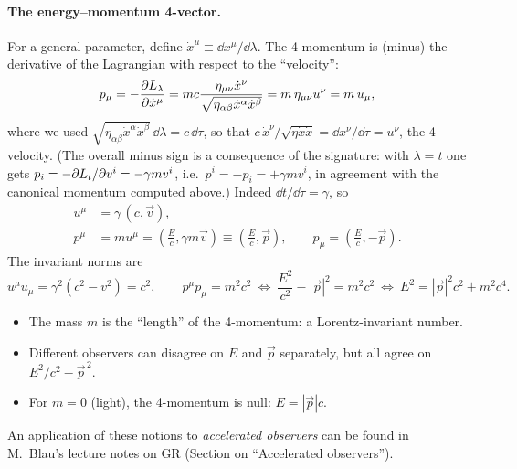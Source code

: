 \paragraph{The energy--momentum 4-vector.} For a general parameter, define $\dot x^\mu\equiv\dd x^\mu/\dd\lambda$. The 4-momentum is (minus) the derivative of the Lagrangian with respect to the ``velocity'':
\begin{equation}
  p_\mu=-\frac{\partial L_\lambda}{\partial\dot x^\mu}=mc\frac{\eta_{\mu\nu}\dot x^\nu}{\sqrt{\eta_{\alpha\beta}\dot x^\alpha\dot x^\beta}}=m\,\eta_{\mu\nu}u^\nu=m\,u_\mu,
\end{equation}
where we used $\sqrt{\eta_{\alpha\beta}\dot x^\alpha\dot x^\beta}\,\dd\lambda=c\,\dd\tau$, so that $c\,\dot x^\nu/\sqrt{\eta\dot x\dot x}=\dd x^\nu/\dd\tau=u^\nu$, the 4-velocity. (The overall minus sign is a consequence of the signature: with $\lambda=t$ one gets $p_i=-\partial L_t/\partial v^i=-\gamma m v^i$, i.e.\ $p^i=-p_i=+\gamma m v^i$, in agreement with the canonical momentum computed above.) Indeed $\dd t/\dd\tau=\gamma$, so
\begin{align}
  u^\mu&=\gamma\,(c,\vec v),\\
  p^\mu&=m u^\mu=\left(\frac Ec,\gamma m\vec v\right)\equiv\left(\frac Ec,\vec p\right),\qquad
  p_\mu=\left(\frac Ec,-\vec p\right).
\end{align}
The invariant norms are
\begin{equation}
  u^\mu u_\mu=\gamma^2(c^2-v^2)=c^2,\qquad
  p^\mu p_\mu=m^2c^2\ \Longleftrightarrow\ \frac{E^2}{c^2}-|\vec p|^2=m^2c^2\ \Longleftrightarrow\ \boxed{E^2=|\vec p|^2c^2+m^2c^4}.
\end{equation}

\begin{remarkbox}
\begin{itemize}[nosep]
  \item The mass $m$ is the ``length'' of the 4-momentum: a Lorentz-invariant number.
  \item Different observers can disagree on $E$ and $\vec p$ separately, but all agree on $E^2/c^2-\vec p^{\,2}$.
  \item For $m=0$ (light), the 4-momentum is null: $E=|\vec p|c$.
\end{itemize}
An application of these notions to \emph{accelerated observers} can be found in M.~Blau's lecture notes on GR (Section on ``Accelerated observers'').
\end{remarkbox}

